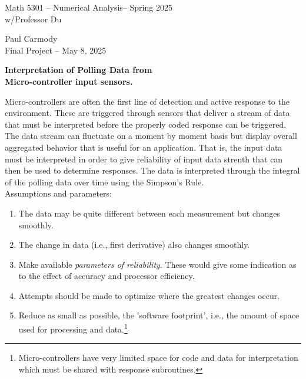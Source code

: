 \documentclass[12pt,a4paper]{report}
\newcommand{\CLASSNAME}{Math 5301 -- Numerical Analysis}
\newcommand{\STUDENTNAME}{Paul Carmody}
\newcommand{\ASSIGNMENT}{Final Project }
\newcommand{\DUEDATE}{May 8, 2025}
\newcommand{\SEMESTER}{Spring 2025}
\begin{document}

\begin{center}
	\Large{\CLASSNAME -- \SEMESTER} \\
	\large{ w/Professor Du}
\end{center}
\begin{center}
	\STUDENTNAME \\
	\ASSIGNMENT -- \DUEDATE\\
\end{center} 
\HLINE

\begin{center}
	\textbf{\Large{Interpretation of Polling Data from \\Micro-controller input sensors.}}\\
\end{center} 

Micro-controllers are often the first line of detection and active response to the environment.  These are triggered through sensors that deliver a stream of data that must be interpreted before the properly coded response can be triggered.  The data stream can fluctuate on a moment by moment basis but display overall aggregated behavior that is useful for an application.  That is, the input data must be interpreted in order to give reliability of input data strenth that can then be used to determine responses.  The data is interpreted through the integral of the polling data over time using the Simpson’s Rule.\\

\noindent Assumptions and parameters:
\begin{enumerate}
	\item The data may be quite different between each measurement but changes smoothly.
	\item The change in data (i.e., first derivative) also changes smoothly.
	\item Make available \textit{parameters of reliability}.  These would give some indication as to the effect of accuracy and processor efficiency.
	\item Attempts should be made to optimize where the greatest changes occur.
	\item Reduce as small as possible, the 'software footprint', i.e., the amount of space used for processing and data.\footnote{Micro-controllers have very limited space for code and data for interpretation which must be shared with response subroutines.}\\
\end{enumerate}
\end{document}
